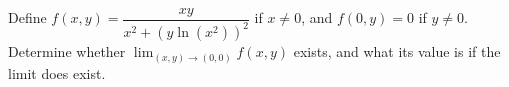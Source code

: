 Define $f(x, y) = \dfrac{xy}{x^2 + (y \ln(x^2))^2}$ if $x \ne 0$, and $f(0, y)
= 0$ if $y \ne 0$. Determine whether $\displaystyle{\lim_{(x,y) \to (0,0)} f(x,
y)}$ exists, and what its value is if the limit does exist.
